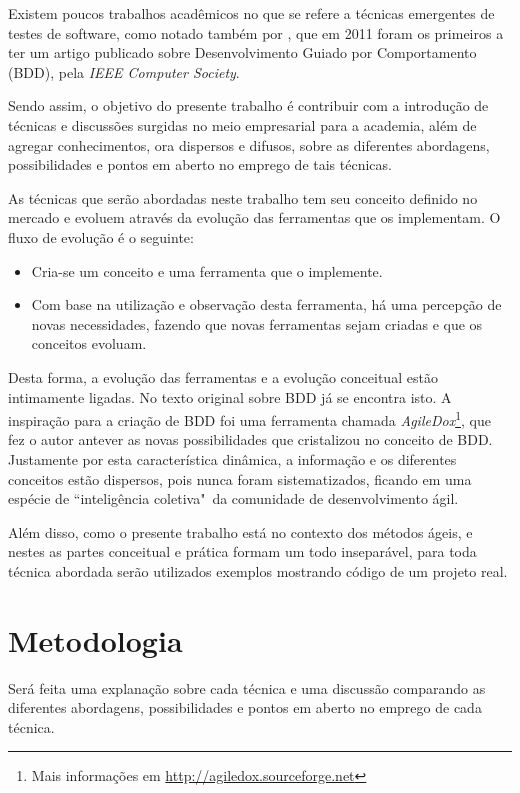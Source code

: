 Existem poucos trabalhos acadêmicos no que se refere a técnicas emergentes de testes de software, como notado também por , que em 2011 foram os primeiros a ter um artigo publicado sobre Desenvolvimento Guiado por Comportamento (BDD), pela \textit{IEEE Computer Society}.

Sendo assim, o objetivo do presente trabalho é contribuir com a introdução de técnicas e discussões surgidas no meio empresarial para a academia, além de agregar conhecimentos, ora dispersos e difusos, sobre as diferentes abordagens, possibilidades e pontos em aberto no emprego de tais técnicas.

As técnicas que serão abordadas neste trabalho tem seu conceito definido no mercado e evoluem através da evolução das ferramentas que os implementam. O fluxo de evolução é o seguinte:

\begin{itemize}
  \item Cria-se um conceito e uma ferramenta que o implemente.
  \item Com base na utilização e observação desta ferramenta, há uma percepção de novas necessidades, fazendo que novas ferramentas sejam criadas e que os conceitos evoluam.
\end{itemize}

Desta forma, a evolução das ferramentas e a evolução conceitual estão intimamente ligadas. No texto original sobre BDD \cite{IntroducingBDD} já se encontra isto. A inspiração para a criação de BDD foi uma ferramenta chamada \textit{AgileDox}\footnote{Mais informações em \url{http://agiledox.sourceforge.net}}, que fez o autor antever as novas possibilidades que cristalizou no conceito de BDD. Justamente por esta característica dinâmica, a informação e os diferentes conceitos estão dispersos, pois nunca foram sistematizados, ficando em uma espécie de ``inteligência coletiva"\ da comunidade de desenvolvimento ágil.

Além disso, como o presente trabalho está no contexto dos métodos ágeis, e nestes as partes conceitual e prática formam um todo inseparável, para toda técnica abordada serão utilizados exemplos mostrando código de um projeto real.

\section{Metodologia}

Será feita uma explanação sobre cada técnica e uma discussão comparando as diferentes abordagens, possibilidades e pontos em aberto no emprego de cada técnica.

